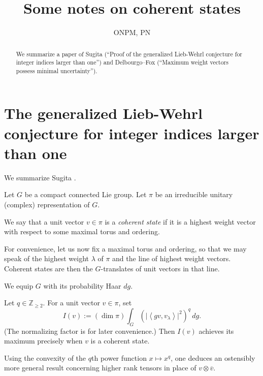 \documentclass[reqno]{amsart} 
\begin{document}
\author{ONPM, PN}
\title{Some notes on coherent states}


\begin{abstract}
  We summarize a paper of Sugita (``Proof of the generalized Lieb-Wehrl conjecture for integer indices larger than one'') and Delbourgo--Fox (``Maximum weight vectors possess minimal uncertainty'').
\end{abstract}

\maketitle

\section{The generalized Lieb-Wehrl conjecture for integer indices larger than one}\label{sec:cngub4lfbx}
We summarize Sugita \cite{MR1946863}.

Let $G$ be a compact connected Lie group.  Let $\pi$ be an irreducible unitary (complex) representation of $G$.

\begin{definition}\label{definition:cngsx0l9k6}
  We say that a unit vector $v \in \pi$ is a \emph{coherent state} if it is a highest weight vector with respect to some maximal torus and ordering.
\end{definition}

For convenience, let us now fix a maximal torus and ordering, so that we may speak of the highest weight $\lambda$ of $\pi$ and the line of highest weight vectors.  Coherent states are then the $G$-translates of unit vectors in that line.

We equip $G$ with its probability Haar $d g$.

\begin{theorem}\label{theorem:cngsx0yg7y}
  Let $q \in \mathbb{Z}_{\geq 2}$.  For a unit vector $v \in \pi$, set
  \begin{equation*}
    I(v) :=
    (\dim \pi)
    \int_{G}
    \left( \lvert \left\langle g v, v_\lambda \right\rangle \rvert^2 \right)^q
    \, d g.
  \end{equation*}
  (The normalizing factor is for later convenience.)  Then $I(v)$ achieves its maximum precisely when $v$ is a coherent state.
\end{theorem}
\begin{remark}\label{remark:cngsx0yf26}
  Using the convexity of the $q$th power function $x \mapsto x^q$, one deduces an ostensibly more general result concerning higher rank tensors in place of $v \otimes \overline{v}$.
\end{remark}
\end{document}
